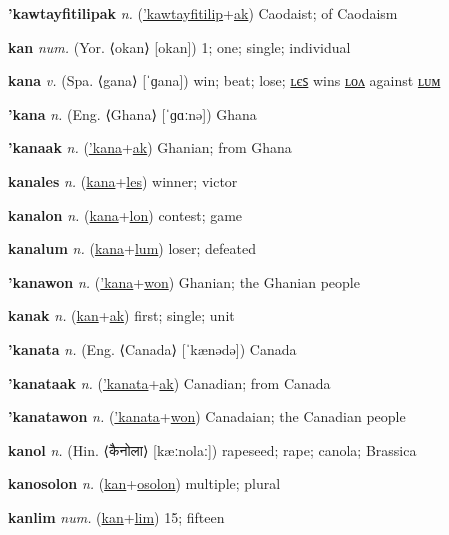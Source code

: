 \textbf{\hypertarget{'kawtayfitilipak}{'kawtayfitilipak}} \textit{n.} (\hyperlink{'kawtayfitilip}{'kawtayfitilip}+\allowbreak \hyperlink{ak}{ak})
Caodaist; of Caodaism

\textbf{\hypertarget{kan}{kan}} \textit{num.} (Yor. ⟨okan⟩ [okan])
1; one; single; individual

\textbf{\hypertarget{kana}{kana}} \textit{v.} (Spa. ⟨gana⟩ [ˈɡana])
win; beat; lose; \hyperlink{kanales}{ʟєꜱ} wins \hyperlink{kanalon}{ʟᴏᴧ} against \hyperlink{kanalum}{ʟᴜᴍ}

\textbf{\hypertarget{'kana}{'kana}} \textit{n.} (Eng. ⟨Ghana⟩ [ˈɡɑːnə])
Ghana

\textbf{\hypertarget{'kanaak}{'kanaak}} \textit{n.} (\hyperlink{'kana}{'kana}+\allowbreak \hyperlink{ak}{ak})
Ghanian; from Ghana

\textbf{\hypertarget{kanales}{kanales}} \textit{n.} (\hyperlink{kana}{kana}+\allowbreak \hyperlink{les}{les})
winner; victor

\textbf{\hypertarget{kanalon}{kanalon}} \textit{n.} (\hyperlink{kana}{kana}+\allowbreak \hyperlink{lon}{lon})
contest; game

\textbf{\hypertarget{kanalum}{kanalum}} \textit{n.} (\hyperlink{kana}{kana}+\allowbreak \hyperlink{lum}{lum})
loser; defeated

\textbf{\hypertarget{'kanawon}{'kanawon}} \textit{n.} (\hyperlink{'kana}{'kana}+\allowbreak \hyperlink{won}{won})
Ghanian; the Ghanian people

\textbf{\hypertarget{kanak}{kanak}} \textit{n.} (\hyperlink{kan}{kan}+\allowbreak \hyperlink{ak}{ak})
first; single; unit

\textbf{\hypertarget{'kanata}{'kanata}} \textit{n.} (Eng. ⟨Canada⟩ [ˈkænədə])
Canada

\textbf{\hypertarget{'kanataak}{'kanataak}} \textit{n.} (\hyperlink{'kanata}{'kanata}+\allowbreak \hyperlink{ak}{ak})
Canadian; from Canada

\textbf{\hypertarget{'kanatawon}{'kanatawon}} \textit{n.} (\hyperlink{'kanata}{'kanata}+\allowbreak \hyperlink{won}{won})
Canadaian; the Canadian people

\textbf{\hypertarget{kanol}{kanol}} \textit{n.} (Hin. ⟨{\devanagari{}कैनोला}⟩ [kæːnolaː])
rapeseed; rape; canola; Brassica

\textbf{\hypertarget{kanosolon}{kanosolon}} \textit{n.} (\hyperlink{kan}{kan}+\allowbreak \hyperlink{osolon}{osolon})
multiple; plural

\textbf{\hypertarget{kanlim}{kanlim}} \textit{num.} (\hyperlink{kan}{kan}+\allowbreak \hyperlink{lim}{lim})
15; fifteen

